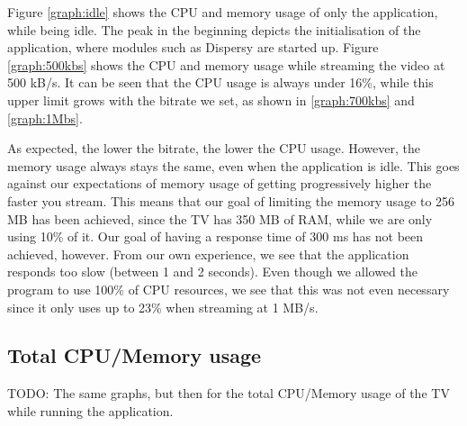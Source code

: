 Figure \ref{graph:idle} shows the CPU and memory usage of only the application, while being 
idle.
The peak in the beginning depicts the initialisation of the application, where modules such 
as Dispersy are started up.
Figure \ref{graph:500kbs} shows the CPU and memory usage while streaming the video at 500 
kB/s. It can be seen that the CPU usage is
always under 16\%, while this upper limit grows with the bitrate we set, as shown in 
\ref{graph:700kbs} and \ref{graph:1Mbs}.

As expected, the lower the bitrate, the lower the CPU usage. However, the memory usage 
always stays the same, even when the application is idle. This goes against our 
expectations of memory usage of getting progressively higher the faster you stream. This 
means that our goal of limiting the memory usage to 256 MB has been achieved, since the TV 
has 350 MB of RAM, while we are only using 10\% of it. Our goal of having a response time 
of 300 ms has not been achieved, however. From our own experience, we see that the 
application responds too slow (between 1 and 2 seconds). Even though we allowed the 
program to use 100\% of CPU resources, we see that this was not even necessary since it 
only uses up to 23\% when streaming at 1 MB/s.

\subsection{Total CPU/Memory usage}
TODO: The same graphs, but then for the total CPU/Memory usage of the TV while running the application.